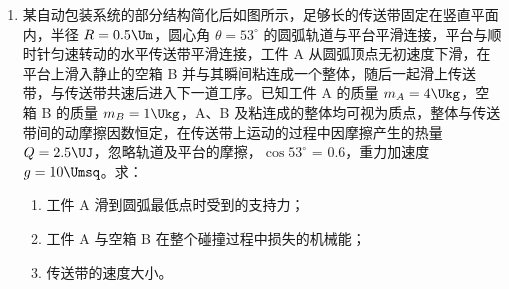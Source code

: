 \documentclass[\gkver]{gaokaozhenti}
\begin{document}
\begin{enumerate}


\item
某自动包装系统的部分结构简化后如图所示，足够长的传送带固定在竖直平面内，半径 $R = 0.5 \Um$，圆心角 $\theta = 53^\circ$ 的圆弧轨道与平台平滑连接，平台与顺时针匀速转动的水平传送带平滑连接，工件 A 从圆弧顶点无初速度下滑，在平台上滑入静止的空箱 B 并与其瞬间粘连成一个整体，随后一起滑上传送带，与传送带共速后进入下一道工序。已知工件 A 的质量 $m_{A} = 4 \Ukg$，空箱 B 的质量 $m_{B} = 1 \Ukg$，A、B 及粘连成的整体均可视为质点，整体与传送带间的动摩擦因数恒定，在传送带上运动的过程中因摩擦产生的热量 $Q = 2.5 \UJ$，忽略轨道及平台的摩擦，$\cos 53^\circ$ = 0.6，重力加速度 $g = 10 \Umsq$。求：

\begin{enumerate}
	\item
	工件 A 滑到圆弧最低点时受到的支持力；
	\item
	工件 A 与空箱 B 在整个碰撞过程中损失的机械能；
	\item
	传送带的速度大小。
\end{enumerate}


\end{enumerate}
\end{document}
